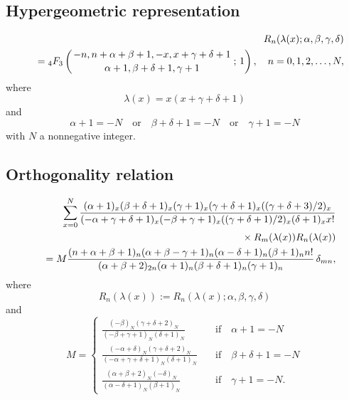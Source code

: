 \documentclass[envcountchap,graybox]{svmono}
\newcommand{\hyp}[5]{\mbox{}_{#1}{F}_{#2}
\left(\genfrac{}{}{0pt}{}{#3}{#4}\,;\,#5\right)}
\newcommand{\mathindent}{\hspace{7.5mm}}
\begin{document}
\par\setcounter{equation}{0}

\subsection*{Hypergeometric representation}
\begin{eqnarray}
\label{DefRacah}
& &R_n(\lambda(x);\alpha,\beta,\gamma,\delta)\nonumber\\
& &{}=\hyp{4}{3}{-n,n+\alpha+\beta+1,-x,x+\gamma+\delta+1}{\alpha+1,\beta+\delta+1,\gamma+1}{1},
\quad n=0,1,2,\ldots,N,
\end{eqnarray}
where
$$\lambda(x)=x(x+\gamma+\delta+1)$$
and
$$\alpha+1=-N\quad\textrm{or}\quad\beta+\delta+1=-N\quad\textrm{or}\quad\gamma+1=-N$$
with $N$ a nonnegative integer.

\subsection*{Orthogonality relation}
\begin{eqnarray}
\label{OrtRacah}
& &\sum_{x=0}^N\frac{(\alpha+1)_x(\beta+\delta+1)_x(\gamma+1)_x(\gamma+\delta+1)_x((\gamma+\delta+3)/2)_x}
{(-\alpha+\gamma+\delta+1)_x(-\beta+\gamma+1)_x((\gamma+\delta+1)/2)_x(\delta+1)_xx!}\nonumber\\
& &{}\mathindent\times R_m(\lambda(x))R_n(\lambda(x))\nonumber\\
& &{}=M\frac{(n+\alpha+\beta+1)_n(\alpha+\beta-\gamma+1)_n(\alpha-\delta+1)_n(\beta+1)_nn!}
{(\alpha+\beta+2)_{2n}(\alpha+1)_n(\beta+\delta+1)_n(\gamma+1)_n}\,\delta_{mn},
\end{eqnarray}
where
$$R_n(\lambda(x)):=R_n(\lambda(x);\alpha,\beta,\gamma,\delta)$$
and
$$M=\left\{\begin{array}{ll}
\displaystyle\frac{(-\beta)_N(\gamma+\delta+2)_N}{(-\beta+\gamma+1)_N(\delta+1)_N}&\quad\textrm{if}\quad\alpha+1=-N\\[5mm]
\displaystyle\frac{(-\alpha+\delta)_N(\gamma+\delta+2)_N}{(-\alpha+\gamma+\delta+1)_N(\delta+1)_N}&\quad\textrm{if}\quad\beta+\delta+1=-N\\[5mm]
\displaystyle\frac{(\alpha+\beta+2)_N(-\delta)_N}{(\alpha-\delta+1)_N(\beta+1)_N}&\quad\textrm{if}\quad\gamma+1=-N.
\end{array}\right.$$
\end{document}
